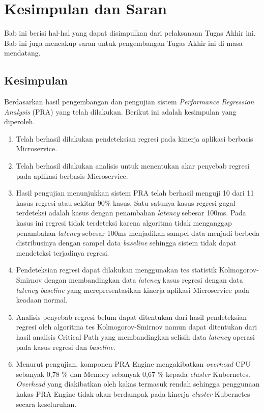 \chapter{Kesimpulan dan Saran}
Bab ini berisi hal-hal yang dapat disimpulkan dari pelaksanaan Tugas Akhir ini. Bab ini juga mencakup saran untuk pengembangan Tugas Akhir ini di masa mendatang.

\section{Kesimpulan}
Berdasarkan hasil pengembangan dan pengujian sistem \textit{Performance Regression Analysis} (PRA) yang telah dilakukan. Berikut ini adalah kesimpulan yang diperoleh.
\begin{enumerate}
	\item Telah berhasil dilakukan pendeteksian regresi pada kinerja aplikasi berbasis Microservice.
	\item Telah berhasil dilakukan analisis untuk menentukan akar penyebab regresi pada aplikasi berbasis Microservice.
	\item Hasil pengujian menunjukkan sistem PRA telah berhasil menguji 10 dari 11 kasus regresi atau sekitar 90\% kasus. Satu-satunya kasus regresi gagal terdeteksi adalah kasus dengan penambahan \textit{latency} sebesar 100ms. Pada kasus ini regresi tidak terdeteksi karena algoritma tidak menganggap penambahan \textit{latency} sebesar 100ms menjadikan sampel data menjadi berbeda distribusinya dengan sampel data \textit{baseline} sehingga sistem tidak dapat mendeteksi terjadinya regresi.
	\item Pendeteksian regresi dapat dilakukan menggunakan tes statistik Kolmogorov-Smirnov dengan membandingkan data \textit{latency} kasus regresi dengan data \textit{latency} \textit{baseline} yang merepresentasikan kinerja aplikasi Microservice pada keadaan normal.
	\item Analisis penyebab regresi belum dapat ditentukan dari hasil pendeteksian regresi oleh algoritma tes Kolmogorov-Smirnov namun dapat ditentukan dari hasil analisis Critical Path yang membandingkan selisih data \textit{latency} operasi pada kasus regresi dan \textit{baseline}.
	\item Menurut pengujian, komponen PRA Engine mengakibatkan \textit{overhead} CPU sebanyak 0,78 \% dan Memory sebanyak 0,67 \% kepada \textit{cluster} Kubernetes. \textit{Overhead} yang diakibatkan oleh kakas termasuk rendah sehingga penggunaan kakas PRA Engine tidak akan berdampak pada kinerja \textit{cluster} Kubernetes secara keseluruhan.\textbf{}
\end{enumerate}

